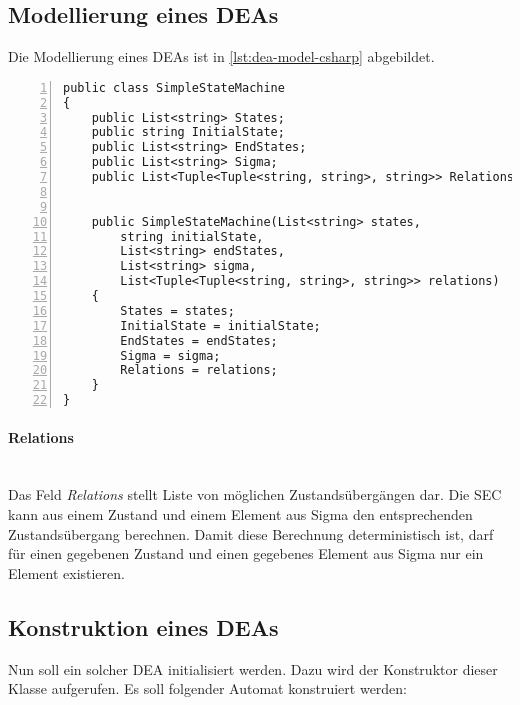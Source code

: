 \subsection{Modellierung eines DEAs}
Die Modellierung eines DEAs ist in \cref{lst:dea-model-csharp} abgebildet. 

\begin{lstlisting}[breaklines=true, tabsize=2, showstringspaces=false, frame=single, numbers=left, basicstyle=\small, label = {lst:dea-model-csharp}, caption={Modellierung eines DEA in C\#}, captionpos=b] 
public class SimpleStateMachine
{
	public List<string> States;
	public string InitialState;
	public List<string> EndStates;
	public List<string> Sigma;
	public List<Tuple<Tuple<string, string>, string>> Relations;
	
	
	public SimpleStateMachine(List<string> states,
		string initialState,
		List<string> endStates,
		List<string> sigma,
		List<Tuple<Tuple<string, string>, string>> relations)
	{
		States = states;
		InitialState = initialState;
		EndStates = endStates;
		Sigma = sigma;
		Relations = relations;
	}
}
\end{lstlisting}

\paragraph*{Relations} \mbox{}\\
Das Feld \textit{Relations} stellt Liste von möglichen Zustandsübergängen dar. Die SEC kann aus einem Zustand und einem Element aus Sigma den entsprechenden Zustandsübergang berechnen. Damit diese Berechnung deterministisch ist, darf für einen gegebenen Zustand und einen gegebenes Element aus Sigma nur ein Element existieren. 

\subsection{Konstruktion eines DEAs}
Nun soll ein solcher DEA initialisiert werden. Dazu wird der Konstruktor dieser Klasse aufgerufen. Es soll folgender Automat konstruiert werden:

